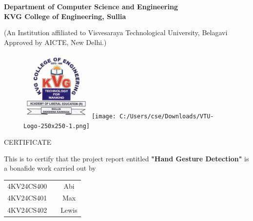 \documentclass{report}
\begin{document}
	\newlength{\toptafiddle}
	\newlength{\bottafiddle}
	\thispagestyle{empty}
	\setlength{\toptafiddle}{1in}
	\setlength{\bottafiddle}{1in}
	
	\vspace*{-0.75in}
	\enlargethispage{\toptafiddle}
	\begin{center}
		\begin{Large}
			\textbf{Department of Computer Science and Engineering\\KVG College of Engineering, Sullia}\\
		\end{Large}
		\begin{small}
			(An Institution affiliated to Visvesaraya Technological University, Belagavi\\Approved by AICTE, New Delhi.)\\
		\end{small}
		\vspace{0.2cm}
		\begin{figure}[h]
			\centering
			\includegraphics[height=3.5cm]{kvg logo mp1.jpg}
			\hspace{0.1\textwidth}
			\texttt{[image: C:/Users/cse/Downloads/VTU-Logo-250x250-1.png]}
		\end{figure}
		\vspace*{0.15in}
		\large{CERTIFICATE}
	\end{center}
	
	This is to certify that the project report entitled \textbf{"Hand Gesture Detection"} is a bonafide work carried out by \vspace*{-0.20in}
	\begin{table}[h!]
		\begin{center}
			\begin{tabular}{ccc}
				4KV24CS400 && Abi\\
				4KV24CS401 && Max\\
				4KV24CS402 && Lewis\\
			\end{tabular}
		\end{center}
	\end{table}
	
\end{document}
